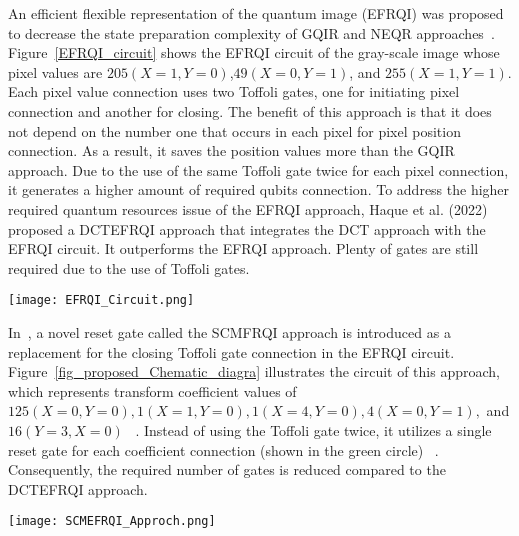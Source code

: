 \par An efficient flexible representation of the quantum image (EFRQI) was proposed to decrease the state preparation complexity of GQIR and NEQR approaches~\cite{b20}. Figure~\ref{EFRQI_circuit} shows the EFRQI circuit of the gray-scale image whose pixel values are $205(X=1, Y=0)$,$49(X=0, Y=1)$, and $255(X=1, Y=1)$. Each pixel value connection uses two Toffoli gates, one for initiating pixel connection and another for closing. The benefit of this approach is that it does not depend on the number one that occurs in each pixel for pixel position connection. As a result, it saves the position values more than the GQIR approach. Due to the use of the same Toffoli gate twice for each pixel connection, it generates a higher amount of required qubits connection. To address the higher required quantum resources issue of the EFRQI approach, Haque et al. (2022)~\cite{b9} proposed a DCTEFRQI approach that integrates the DCT approach with the EFRQI circuit. It outperforms the EFRQI approach. Plenty of gates are still required due to the use of Toffoli gates. 

\begin{figure*}[htbp]
\centerline{\texttt{[image: EFRQI\_Circuit.png]}}
\caption{An EFRQI circuit for pixel values representation}
\label{EFRQI_circuit}
\end{figure*}

\par In~\cite{bb17}, a novel reset gate called the SCMFRQI approach is introduced as a replacement for the closing Toffoli gate connection in the EFRQI circuit. Figure~\ref{fig_proposed_Chematic_diagra} illustrates the circuit of this approach, which represents transform coefficient values of $125(X=0, Y=0), 1(X=1, Y=0), 1(X=4, Y=0), 4(X=0, Y=1),$ and $16(Y=3, X=0)$ ~\cite{haque2022novel}. Instead of using the Toffoli gate twice, it utilizes a single reset gate for each coefficient connection (shown in the green circle) ~\cite{bb17}. Consequently, the required number of gates is reduced compared to the DCTEFRQI approach.

\begin{figure*}[htbp]
\centerline{\texttt{[image: SCMEFRQI\_Approch.png]}}
\caption{A SCMFRQI circuit for transformed coefficient value representation.}
\label{fig_proposed_Chematic_diagra}
\end{figure*}